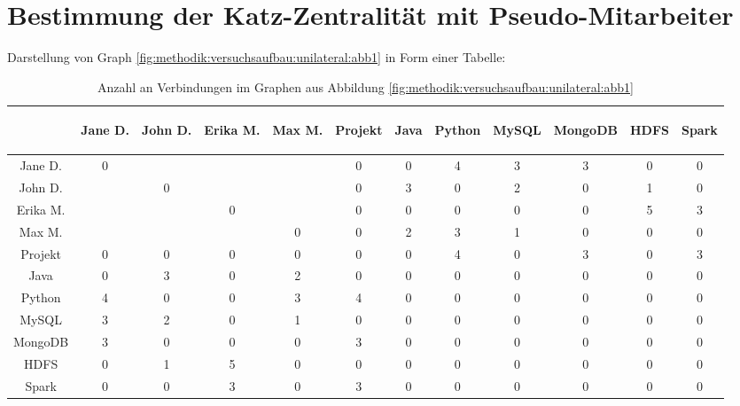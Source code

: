 \section{Bestimmung der Katz-Zentralität mit Pseudo-Mitarbeiter}
\label{ch:nebenrechnungen:katzZentralitaetPseudoMitarbeiter}
Darstellung von Graph \ref{fig:methodik:versuchsaufbau:unilateral:abb1} in Form einer Tabelle:
\begin{table}[h]
	\centering
	\begin{tabular}{c|c|c|c|c|c|c|c|c|c|c|c}
		& \begin{sideways}Jane D.\end{sideways} & \begin{sideways}John D.\end{sideways} & \begin{sideways}Erika M.\end{sideways} & \begin{sideways}Max M.\end{sideways} & \begin{sideways}Projekt\end{sideways} & \begin{sideways}Java\end{sideways} & \begin{sideways}Python\end{sideways} & \begin{sideways}MySQL\end{sideways} & \begin{sideways}MongoDB\end{sideways} & \begin{sideways}HDFS\end{sideways} & \begin{sideways}Spark\end{sideways} \\
		\hline
		Jane D.  & 0 & \kantengewicht & \kantengewicht & \kantengewicht & 0 & 0 & 4 & 3 & 3 & 0 & 0\\
		John D.  & \kantengewicht & 0 & \kantengewicht & \kantengewicht & 0 & 3 & 0 & 2 & 0 & 1 & 0\\
		Erika M. & \kantengewicht & \kantengewicht & 0 & \kantengewicht & 0 & 0 & 0 & 0 & 0 & 5 & 3\\
		Max M.   & \kantengewicht & \kantengewicht & \kantengewicht & 0 & 0 & 2 & 3 & 1 & 0 & 0 & 0\\
		Projekt  & 0 & 0 & 0 & 0 & 0 & 0 & 4 & 0 & 3 & 0 & 3\\
		Java     & 0 & 3 & 0 & 2 & 0 & 0 & 0 & 0 & 0 & 0 & 0\\
		Python   & 4 & 0 & 0 & 3 & 4 & 0 & 0 & 0 & 0 & 0 & 0\\
		MySQL    & 3 & 2 & 0 & 1 & 0 & 0 & 0 & 0 & 0 & 0 & 0\\
		MongoDB  & 3 & 0 & 0 & 0 & 3 & 0 & 0 & 0 & 0 & 0 & 0\\
		HDFS     & 0 & 1 & 5 & 0 & 0 & 0 & 0 & 0 & 0 & 0 & 0\\
		Spark    & 0 & 0 & 3 & 0 & 3 & 0 & 0 & 0 & 0 & 0 & 0
	\end{tabular}
	\caption{Anzahl an Verbindungen im Graphen aus Abbildung \ref{fig:methodik:versuchsaufbau:unilateral:abb1}}
	\label{tbl:berechnungDerKatzZentralitaetPseudoMitarbeiter:tbl1}
\end{table}

